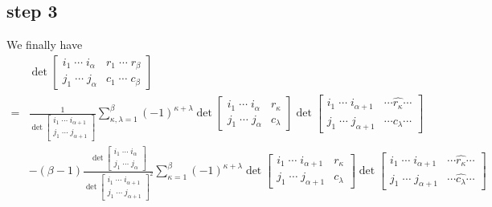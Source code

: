 \documentclass{amsart}
\begin{document}
{    \subsection{step 3}
    {
        We finally have 
        \begin{align}
            &\det\begin{bmatrix}
                i_1\;\cdots\;i_\alpha&r_1\;\cdots\;r_\beta\\
                j_1\;\cdots\;j_\alpha&c_1\;\cdots\;c_\beta
            \end{bmatrix}\\
            ={}&\frac{1}{\det\begin{bmatrix}
                i_1\;\cdots\;i_{\alpha+1}\\
                j_1\;\cdots\;j_{\alpha+1}
            \end{bmatrix}}\sum_{\kappa,\lambda=1}^\beta(-1)^{\kappa+\lambda}\det\begin{bmatrix}
                i_1\;\cdots\;i_\alpha&r_\kappa\\
                j_1\;\cdots\;j_\alpha&c_\lambda
            \end{bmatrix}\det\begin{bmatrix}
                i_1\;\cdots\;i_{\alpha+1}&\cdots\widehat{r_\kappa}\cdots\\
                j_1\;\cdots\;j_{\alpha+1}&\cdots\widehat{c_\lambda}\cdots
            \end{bmatrix}\\
            &-(\beta-1)\frac{\det\begin{bmatrix}
                i_1\;\cdots\;i_\alpha\\
                j_1\;\cdots\;j_\alpha
            \end{bmatrix}}{\det\begin{bmatrix}
                i_1\;\cdots\;i_{\alpha+1}\\
                j_1\;\cdots\;j_{\alpha+1}
            \end{bmatrix}^2}\sum_{\kappa=1}^\beta(-1)^{\kappa+\lambda}\det\begin{bmatrix}
                i_1\;\cdots\;i_{\alpha+1}&r_\kappa\\
                j_1\;\cdots\;j_{\alpha+1}&c_\lambda
            \end{bmatrix}\det\begin{bmatrix}
                i_1\;\cdots\;i_{\alpha+1}&\cdots\widehat{r_\kappa}\cdots\\
                j_1\;\cdots\;j_{\alpha+1}&\cdots\widehat{c_\lambda}\cdots

\end{bmatrix}
\end{align}}}
\end{document}
